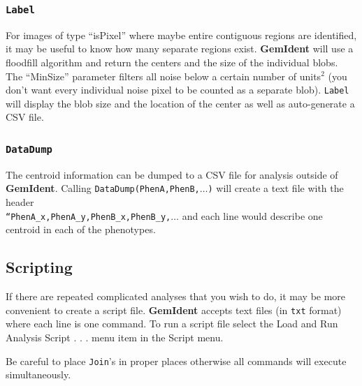 \documentclass[12pt]{article}
\begin{document}
\subsubsection{\tt Label}

For images of type ``isPixel'' where maybe entire contiguous regions are identified, it may be useful to know how many separate regions exist. {\bf GemIdent} will use a floodfill algorithm\cite{floodfill} and return the centers and the size of the individual blobs. The ``MinSize'' parameter filters all noise below a certain number of units$^2$ (you don't want every individual noise pixel to be counted as a separate blob). {\tt Label} will display the blob size and the location of the center as well as auto-generate a CSV file.

\subsubsection{\tt DataDump}

The centroid information can be dumped to a CSV file for analysis outside of {\bf GemIdent}. Calling {\tt DataDump(PhenA,PhenB,$\ldots$)} will create a text file with the header \\ {\tt ``PhenA\_x,PhenA\_y,PhenB\_x,PhenB\_y,$\ldots$}
 and each line would describe one centroid in each of the phenotypes.

\subsection{Scripting}

If there are repeated complicated analyses that you wish to do, it may be more convenient to create a script file. {\bf GemIdent} accepts text files (in {\tt txt} format) where each line is one command. To run a script file select the {\sf Load and Run Analysis Script . . .} menu item in the {\sf Script} menu.

Be careful to place {\tt Join}'s in proper places otherwise all commands will execute simultaneously.
\end{document}
